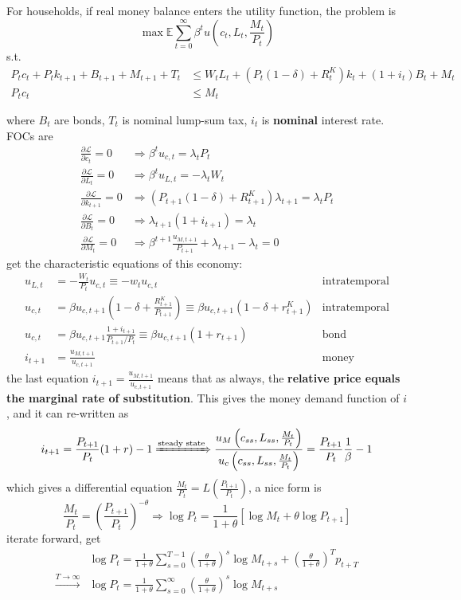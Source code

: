 \documentclass[10pt,landscape,a4paper]{article}
\begin{document}
\begin{multicols*}{3}
For households, if real money balance enters the utility function, the problem is
$$
\max \mathbb{E}\sum^{\infty}_{t=0}\beta^t u\left(c_t,L_t,\frac{M_t}{P_t}\right)
$$
s.t.
\begin{align*}
    P_tc_t+P_tk_{t+1}+B_{t+1}+M_{t+1}+T_t &\leq W_tL_t+(P_t(1-\delta)+R_t^K)k_t+(1+i_t)B_t+M_t\\
    P_tc_t& \leq M_t
\end{align*}

where $B_t$ are bonds, $T_t$ is nominal lump-sum tax, $i_t$ is \textbf{nominal} interest rate. FOCs are
\begin{align*}
    \frac{\partial\mathcal{L}}{\partial c_t}=0&\Rightarrow \beta^t u_{c,t}=\lambda_tP_t \\
    \frac{\partial\mathcal{L}}{\partial L_t}=0&\Rightarrow \beta^t u_{L,t} =- \lambda_tW_t \\
    \frac{\partial\mathcal{L}}{\partial k_{t+1}}=0 &\Rightarrow (P_{t+1}(1-\delta)+R_{t+1}^K)\lambda_{t+1}=\lambda_tP_t\\
    \frac{\partial\mathcal{L}}{\partial B_t}=0 &\Rightarrow \lambda_{t+1}(1+i_{t+1}) = \lambda_t\\
    \frac{\partial\mathcal{L}}{\partial M_t}=0 &\Rightarrow \beta^{t+1} \frac{u_{M,t+1}}{P_{t+1}} +\lambda_{t+1}-\lambda_t = 0
\end{align*}
get the characteristic equations of this economy:
\begin{align*}
    u_{L,t} &= -\frac{W_t}{P_t}u_{c,t}\equiv -w_t u_{c,t} & \text{intratemporal}\\
    u_{c,t} &= \beta u_{c,t+1}\left( 1-\delta + \frac{R^K_{t+1}}{P_{t+1}} \right)\equiv \beta u_{c,t+1}(1-\delta+r_{t+1}^K) & \text{intratemporal}\\
    u_{c,t} &= \beta u_{c,t+1} \frac{1+i_{t+1}}{P_{t+1}/P_t} \equiv \beta u_{c,t+1}(1+r_{t+1}) & \text{bond} \\
    i_{t+1} &= \frac{u_{M,t+1}}{u_{c,t+1}} &\text{money}
\end{align*}
the last equation $i_{t+1} = \frac{u_{M,t+1}}{u_{c,t+1}}$ means that as always, the \textbf{relative price equals the {\color{myred}marginal rate of substitution}}. This gives the money demand function of $i$, and it can re-written as
$$
i_{t+1} = \frac{P_{t+1}}{P_t}(1+r) -1 \xRightarrow{\text{steady state}} \frac{u_{M}\left(c_{ss},L_{ss},\frac{M_{t}}{P_{t}}\right)}{u_{c}\left(c_{ss},L_{ss},\frac{M_{t}}{P_{t}}\right)} = \frac{P_{t+1}}{P_t}\frac{1}{\beta}-1
$$
which gives a differential equation $\frac{M_t}{P_t}=L\left(\frac{P_{t+1}}{P_t}\right)$, a nice form is
$$
\frac{M_t}{P_t}=\left(\frac{P_{t+1}}{P_t}\right)^{-\theta} \Rightarrow \log P_t = \frac{1}{1+\theta}\left[ \log M_t + \theta \log P_{t+1}\right]
$$
iterate forward, get
\begin{align*}
     &\log P_t = \frac{1}{1+\theta}\sum^{T-1}_{s=0}\left(\frac{\theta}{1+\theta}\right)^s \log M_{t+s} +\left(\frac{\theta}{1+\theta}\right)^T p_{t+T}\\
     \xrightarrow{T\rightarrow\infty} & \log P_t = \frac{1}{1+\theta}\sum^{\infty}_{s=0}\left(\frac{\theta}{1+\theta}\right)^s \log M_{t+s}
\end{align*}


\end{multicols*}
\end{document}
